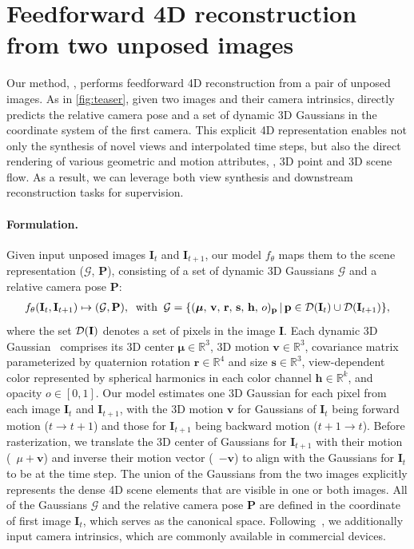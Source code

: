 

\section{Feedforward 4D reconstruction from two unposed images}
\label{sec:method}
Our method, \ourmethod{}, performs feedforward 4D reconstruction from a pair of unposed images. 
As in \cref{fig:teaser}, given two images and their camera intrinsics, \ourmethod{} directly predicts the relative camera pose and a set of dynamic 3D Gaussians in the coordinate system of the first camera. 
This explicit 4D representation enables not only the synthesis of novel views and interpolated time steps, but also the direct rendering of various geometric and motion attributes, \eg, 3D point and 3D scene flow. As a result, we can leverage both view synthesis and downstream reconstruction tasks for supervision.

\paragraph{Formulation.}

Given input unposed images $\mathbf{I}_t$ and $\mathbf{I}_{t+1}$, our model $f_{\theta}$ maps them to the scene representation ($\mathcal{G}$, $\mathbf{P}$), consisting of a set of dynamic 3D Gaussians $\mathcal{G}$ and a relative camera pose $\mathbf{P}$:
\begin{gather}
f_{\theta}(\mathbf{I}_t, \mathbf{I}_{t+1}) \mapsto (\mathcal{G}, \mathbf{P}), 
\;\; \text{with} \;\; \mathcal{G} = \{ ( \boldsymbol\mu, \, \mathbf{v}, \, \mathbf{r}, \, \mathbf{s}, \, \mathbf{h}, \, o)_{\mathbf{p}} \, | \, \mathbf{p}\in {\mathcal{D}}( \mathbf{I}_{t}) \cup {\mathcal{D}}(\mathbf{I}_{t+1}) \},
\label{eq:d3dgs}
\end{gather}
where the set ${\mathcal{D}}(\mathbf{I})$ denotes a set of pixels in the image $\mathbf{I}$.
Each dynamic 3D Gaussian~\citep{Luiten:2024:D3D} comprises its 3D center $\boldsymbol\mu \in \mathbb{R}^3$, 3D motion $\mathbf{v} \in \mathbb{R}^3$, covariance matrix parameterized by quaternion rotation $\mathbf{r} \in \mathbb{R}^4$ and size $\mathbf{s} \in \mathbb{R}^3$, view-dependent color represented by spherical harmonics in each color channel $\mathbf{h} \in \mathbb{R}^k$, and opacity $o \in [0,1]$.
Our model estimates one 3D Gaussian for each pixel from each image $\mathbf{I}_t$ and $\mathbf{I}_{t+1}$, with the 3D motion $\mathbf{v}$ for Gaussians of $\mathbf{I}_{t}$ being forward motion ($t{\rightarrow}t{+}1$) and those for $\mathbf{I}_{t+1}$ being backward motion ($t{+}1{\rightarrow} t$).
Before rasterization, we translate the 3D center of Gaussians for $\mathbf{I}_{t+1}$ with their motion (\ie~$\mu {+} \mathbf{v}$) and inverse their motion vector (\ie~$-\mathbf{v}$) to align with the Gaussians for $\mathbf{I}_{t}$ to be at the time step.
The union of the Gaussians from the two images explicitly represents the dense 4D scene elements that are visible in one or both images.
All of the Gaussians $\mathcal{G}$ and the relative camera pose $\mathbf{P}$ are defined in the coordinate of first image $\mathbf{I}_t$, which serves as the canonical space.
Following~\citep{Ye:2025:NPN}, we additionally input camera intrinsics, which are commonly available in commercial devices. 

